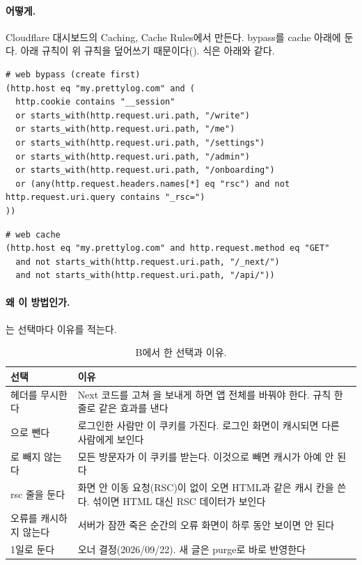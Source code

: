 \paragraph{어떻게.}
Cloudflare 대시보드의 Caching, Cache Rules에서 만든다.
bypass를 cache 아래에 둔다.
아래 규칙이 위 규칙을 덮어쓰기 때문이다().
식은 아래와 같다.

\begin{lstlisting}[language={}]
# web bypass (create first)
(http.host eq "my.prettylog.com" and (
  http.cookie contains "__session"
  or starts_with(http.request.uri.path, "/write")
  or starts_with(http.request.uri.path, "/me")
  or starts_with(http.request.uri.path, "/settings")
  or starts_with(http.request.uri.path, "/admin")
  or starts_with(http.request.uri.path, "/onboarding")
  or (any(http.request.headers.names[*] eq "rsc") and not http.request.uri.query contains "_rsc=")
))
\end{lstlisting}

\begin{lstlisting}[language={}]
# web cache
(http.host eq "my.prettylog.com" and http.request.method eq "GET"
  and not starts_with(http.request.uri.path, "/_next/")
  and not starts_with(http.request.uri.path, "/api/"))
\end{lstlisting}

\paragraph{왜 이 방법인가.}
는 선택마다 이유를 적는다.

\begin{table}[H]
  \caption{B에서 한 선택과 이유.}
  \label{tab:rt-b-why}
  \centering\small
  \begin{tabularx}{\linewidth}{@{}L{4.4cm}Y@{}}
    \toprule
    선택 & 이유 \\
    \midrule
    헤더를 무시한다 & Next 코드를 고쳐 을 보내게 하면 앱 전체를 바꿔야 한다. 규칙 한 줄로 같은 효과를 낸다 \\
    \midrule
    으로 뺀다 & 로그인한 사람만 이 쿠키를 가진다. 로그인 화면이 캐시되면 다른 사람에게 보인다 \\
    \midrule
    로 빼지 않는다 & 모든 방문자가 이 쿠키를 받는다. 이것으로 빼면 캐시가 아예 안 된다 \\
    \midrule
    rsc 줄을 둔다 & 화면 안 이동 요청(RSC)이  없이 오면 HTML과 같은 캐시 칸을 쓴다. 섞이면 HTML 대신 RSC 데이터가 보인다 \\
    \midrule
    오류를 캐시하지 않는다 & 서버가 잠깐 죽은 순간의 오류 화면이 하루 동안 보이면 안 된다 \\
    \midrule
    1일로 둔다 & 오너 결정(2026/09/22). 새 글은 purge로 바로 반영한다 \\
    \bottomrule
  \end{tabularx}
\end{table}

